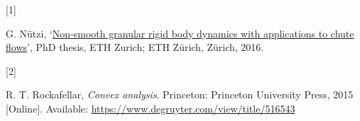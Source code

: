 \documentclass[
  british,
  12pt,
  paper=a4,
  twoside,
  titlepage=true,
  openright,
  abstract=on,
  toc=listofnumbered,
  numbers=noenddot,
  chapterprefix=true,
  headings=optiontohead,
  svgnames,
  dvipsnames]{scrreprt}
\newlength{\cslhangindent}
\newlength{\csllabelwidth}
\newlength{\cslentryspacingunit} %
\newenvironment{CSLReferences}[2] %
 {%
  \setlength{\parindent}{0pt}
  \ifodd #1
  \let\oldpar\par
  \def\par{\hangindent=\cslhangindent\oldpar}
  \fi
  \setlength{\parskip}{#2\cslentryspacingunit}
 }%
 {}
\newcommand{\CSLLeftMargin}[1]{\parbox[t]{\csllabelwidth}{#1}}
\newcommand{\CSLRightInline}[1]{\parbox[t]{\linewidth - \csllabelwidth}{#1}\break}
\begin{document}
\hypertarget{refs}{}
\begin{CSLReferences}{0}{0}
\leavevmode{}%
\CSLLeftMargin{{[}1{]} }
\CSLRightInline{G. Nützi,
{‘\href{https://doi.org/10.3929/ethz-a-010662262}{Non-smooth granular
rigid body dynamics with applications to chute flows}’}, PhD thesis, ETH
Zurich; ETH Zürich, Zürich, 2016. }

\leavevmode{}%
\CSLLeftMargin{{[}2{]} }
\CSLRightInline{R. T. Rockafellar, \emph{Convex analysis}. Princeton:
Princeton University Press, 2015 {[}Online{]}. Available:
\url{https://www.degruyter.com/view/title/516543}}

\end{CSLReferences}
%
\end{document}
